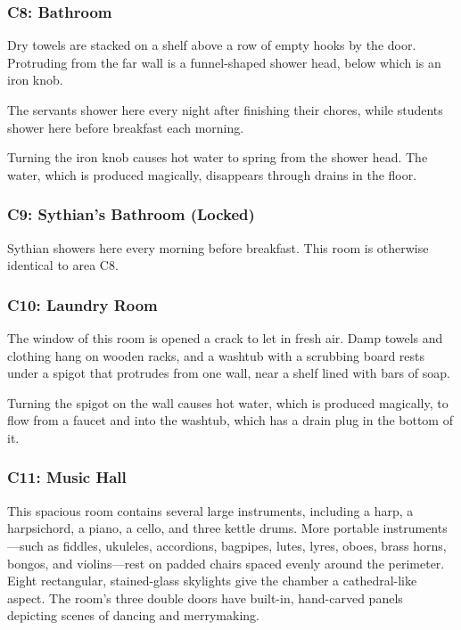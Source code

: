 \documentclass[10pt,a4paper,twoside,bg=print,twocolumn,openany,nodeprecatedcode]{dndbook}
\begin{document}
\subsubsection{C8: Bathroom}
\begin{DndReadAloud}{}
Dry towels are stacked on a shelf above a row of empty hooks by the door. Protruding from the far wall is a funnel-shaped shower head, below which is an iron knob.

\end{DndReadAloud}

The servants shower here every night after finishing their chores, while students shower here before breakfast each morning.

Turning the iron knob causes hot water to spring from the shower head. The water, which is produced magically, disappears through drains in the floor.

\subsubsection{C9: Sythian's Bathroom (Locked)}
Sythian showers here every morning before breakfast. This room is otherwise identical to area C8.

\subsubsection{C10: Laundry Room}
\begin{DndReadAloud}{}
The window of this room is opened a crack to let in fresh air. Damp towels and clothing hang on wooden racks, and a washtub with a scrubbing board rests under a spigot that protrudes from one wall, near a shelf lined with bars of soap.

\end{DndReadAloud}

Turning the spigot on the wall causes hot water, which is produced magically, to flow from a faucet and into the washtub, which has a drain plug in the bottom of it.

\subsubsection{C11: Music Hall}
\begin{DndReadAloud}{}
This spacious room contains several large instruments, including a harp, a harpsichord, a piano, a cello, and three kettle drums. More portable instruments—such as fiddles, ukuleles, accordions, bagpipes, lutes, lyres, oboes, brass horns, bongos, and violins—rest on padded chairs spaced evenly around the perimeter. Eight rectangular, stained-glass skylights give the chamber a cathedral-like aspect. The room's three double doors have built-in, hand-carved panels depicting scenes of dancing and merrymaking.

\end{DndReadAloud}
\end{document}
